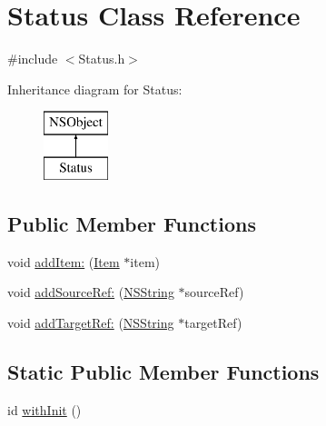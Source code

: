 \hypertarget{interface_status}{
\section{\-Status \-Class \-Reference}
\label{interface_status}
}


{\ttfamily \#include $<$\-Status.\-h$>$}

\-Inheritance diagram for \-Status\-:\begin{figure}[H]
\begin{center}
\leavevmode
\includegraphics[height=2.000000cm]{interface_status}
\end{center}
\end{figure}
\subsection*{\-Public \-Member \-Functions}
\begin{DoxyCompactItemize}
\item 
void \hyperlink{interface_status_a8595de08174a5811eb5fc20e2f267a64}{add\-Item\-:} (\hyperlink{interface_item}{\-Item} $\ast$item)
\item 
void \hyperlink{interface_status_a802a44599a0d1c0231ada34f5efaeae7}{add\-Source\-Ref\-:} (\hyperlink{class_n_s_string}{\-N\-S\-String} $\ast$source\-Ref)
\item 
void \hyperlink{interface_status_a2f91a213551fefc400c408c16580d163}{add\-Target\-Ref\-:} (\hyperlink{class_n_s_string}{\-N\-S\-String} $\ast$target\-Ref)
\end{DoxyCompactItemize}
\subsection*{\-Static \-Public \-Member \-Functions}
\begin{DoxyCompactItemize}
\item 
id \hyperlink{interface_status_a8c5cf015823aa447a64cfea567775ad5}{with\-Init} ()
\end{DoxyCompactItemize}
